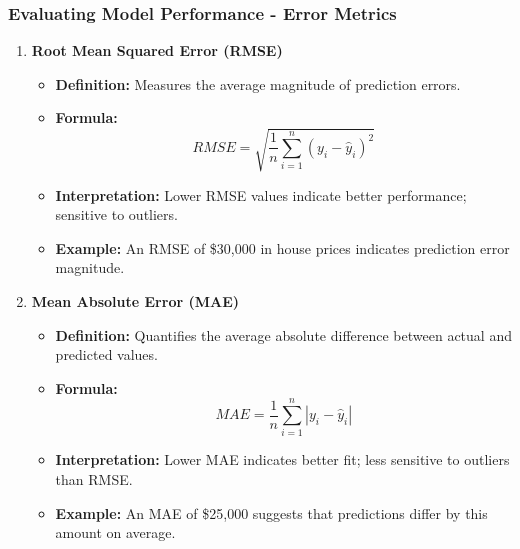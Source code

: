 \documentclass{beamer}
\begin{document}
\begin{frame}[fragile]
    \frametitle{Evaluating Model Performance - Error Metrics}
    \begin{enumerate}[resume]
        \item \textbf{Root Mean Squared Error (RMSE)}
            \begin{itemize}
                \item \textbf{Definition:} Measures the average magnitude of prediction errors.
                \item \textbf{Formula:}
                  \begin{equation}
                    RMSE = \sqrt{\frac{1}{n} \sum_{i=1}^{n} (y_i - \hat{y}_i)^2}
                  \end{equation}
                \item \textbf{Interpretation:} Lower RMSE values indicate better performance; sensitive to outliers.
                \item \textbf{Example:} An RMSE of \$30,000 in house prices indicates prediction error magnitude.
            \end{itemize}

        \item \textbf{Mean Absolute Error (MAE)}
            \begin{itemize}
                \item \textbf{Definition:} Quantifies the average absolute difference between actual and predicted values.
                \item \textbf{Formula:}
                  \begin{equation}
                    MAE = \frac{1}{n} \sum_{i=1}^{n} |y_i - \hat{y}_i|
                  \end{equation}
                \item \textbf{Interpretation:} Lower MAE indicates better fit; less sensitive to outliers than RMSE.
                \item \textbf{Example:} An MAE of \$25,000 suggests that predictions differ by this amount on average.
            \end{itemize}
    \end{enumerate}
\end{frame}
\end{document}
